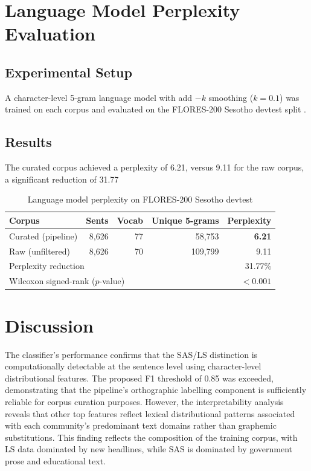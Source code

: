 \documentclass[12pt]{ThesisRU}
\begin{document}
\section{Language Model Perplexity Evaluation}

\subsection{Experimental Setup}
A character-level 5-gram language model with add $-k$ smoothing ($k = 0.1$) was trained on each corpus and evaluated on the FLORES-200 Sesotho devtest split \citep{nllb2022}. 

\subsection{Results}
The curated corpus achieved a perplexity of 6.21, versus 9.11 for the raw corpus, a significant reduction of 31.77%


\begin{table}[ht]
    \centering
    \begin{tabular}{lrrrr}
    \toprule
    \textbf{Corpus} & \textbf{Sents} & \textbf{Vocab}
                    & \textbf{Unique 5-grams} & \textbf{Perplexity} \\
    \midrule
    Curated (pipeline) & 8,626 & 77 & 58,753 & \textbf{6.21} \\
    Raw (unfiltered)   & 8,626 & 70 & 109,799 & 9.11 \\
    \midrule
    \multicolumn{4}{l}{Perplexity reduction} & 31.77\% \\
    \multicolumn{4}{l}{Wilcoxon signed-rank ($p$-value)} & $< 0.001$ \\
    \bottomrule
    \end{tabular}
    \caption{Language model perplexity on FLORES-200 Sesotho devtest}
    \label{tab:per_results}
\end{table}


\section{Discussion}

The classifier's performance confirms that the SAS/LS distinction is computationally detectable at the sentence level using character-level distributional features. The proposed F1 threshold of 0.85 was exceeded, demonstrating that the pipeline's orthographic labelling component is sufficiently reliable for corpus curation purposes. However, the interpretability analysis reveals that other top features reflect lexical distributional patterns associated with each community's predominant text domains rather than graphemic substitutions. This finding reflects the composition of the training corpus, with LS data dominated by new headlines, while SAS is dominated by government prose and educational text.
\end{document}
